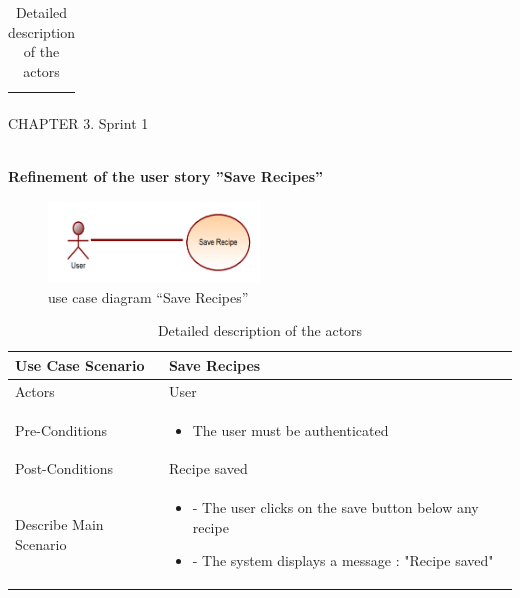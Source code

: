 \documentclass{article}
\begin{document}
{{{{{\begin{table}[h]
\begin{tabularx}{\textwidth}{X|X}
\begin{itemize}[label=$\bullet$]
        \end{itemize} \\
        \bottomrule
    \end{tabularx}
    \caption{Detailed description of the actors}
    \label{tab:actors_roles}
\end{table}
\newpage
\noindent
CHAPTER 3.  Sprint 1 \\
\underline{\hspace{\textwidth}} \vspace{0.2cm}\\
{\large \textbf{Refinement of the user story ”Save Recipes”}
\begin{figure}[htbp]
    \centering
    \includegraphics[width=0.5\textwidth]{save}
    \caption{use case diagram “Save Recipes”}
    \label{fig:design2}
\end{figure}
\begin{table}[h]
    \centering
    \begin{tabularx}{\textwidth}{X|X}
        \toprule
        Use Case Scenario & Save Recipes\\
        \midrule
        Actors & User \\
        \midrule
        Pre-Conditions & \begin{itemize}[label=$\bullet$]
            \item The user must be authenticated
           
        \end{itemize} \\
        \midrule
        Post-Conditions & Recipe saved  \\
        \midrule
        Describe Main Scenario &  \begin{itemize}[label=$\bullet$]
            \item - The user clicks on the save button below any recipe
            \item- The system displays a message : "Recipe saved"
	
           
        \end{itemize} \\
        \bottomrule
    \end{tabularx}
    \caption{Detailed description of the actors}
    \label{tab:actors_roles}
\end{table}






















}}}}}}
\end{document}
